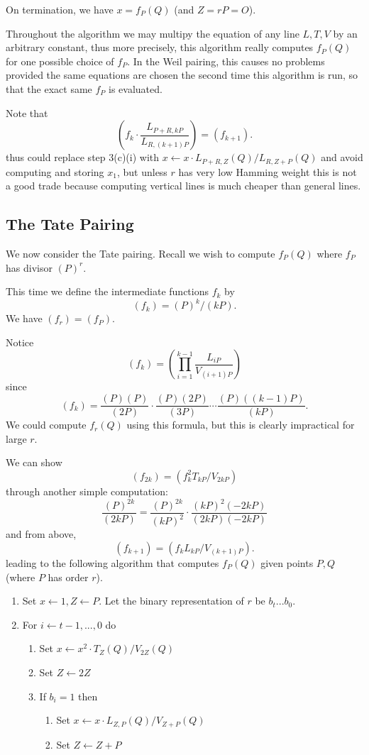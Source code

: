 On termination, we have $x = f_P(Q)$ (and $Z = rP = O$).

Throughout the algorithm we may multipy the equation of any line $L, T, V$
by an arbitrary constant, thus more precisely, this algorithm
really computes $f_P(Q)$ for one possible choice of $f_P$.
In the Weil pairing,
this causes no problems provided the same equations are chosen the second
time this algorithm is run, so that the exact same $f_P$ is evaluated.

Note that
\[
\left(
f_k \cdot \frac{L_{P+R,kP}}{L_{R,(k+1)P}}
\right) = (f_{k+1}) .
\]
thus could replace step 3(c)(i) with
$x \leftarrow x \cdot L_{P+R, Z}(Q) / L_{R,Z+P}(Q)$
and avoid computing and storing $x_1$, but unless
$r$ has very low Hamming weight this is not a good trade
because computing vertical lines is much cheaper than general lines.

\subsection {The Tate Pairing}

We now consider the Tate pairing. Recall we wish to compute
$f_P(Q)$ where $f_P$ has divisor $(P)^r$.

This time we define the intermediate functions $f_k$ by
\[ (f_k) = (P)^k / (kP) . \]
We have $(f_r) = (f_P)$.

Notice
\[ (f_k) = (\prod_{i=1}^{k-1} \frac{L_{iP}}{V_{(i+1)P}}) \]
since
\[ (f_k) =
\frac{(P)(P)}{(2P)}
\cdot
\frac{(P)(2P)}{(3P)}
\cdots
\frac{(P)((k-1)P)}{(kP)} .
\]
We could compute $f_r(Q)$ using this formula,
but this is clearly impractical for large $r$.

We can show
\[
(f_{2k}) = (f_k^2 T_{kP} / V_{2kP} )
\]
through another simple computation:
\[
\frac{(P)^{2k}}{(2kP)} =
\frac{(P)^{2k}}{(kP)^2} \cdot
\frac{(kP)^2 (-2kP)}{(2kP)(-2kP)}
\]
and from above,
\[
(f_{k+1}) = (f_k L_{kP} / V_{(k+1)P}).
\]
leading to the following algorithm that
computes $f_P(Q)$ given points $P,Q$ (where $P$ has order $r$).

\begin{enumerate}
\item
Set $x \leftarrow 1, Z \leftarrow P$.
Let the binary representation of $r$ be $b_t ... b_0$.
\item
For $i \leftarrow t-1, ..., 0$ do
    \begin{enumerate}
    \item
    Set $x \leftarrow x^2 \cdot T_Z(Q) / V_{2Z}(Q)$
    \item
    Set $Z \leftarrow 2Z$
    \item
    If $b_i = 1$ then
	\begin{enumerate}
	\item
	Set $x \leftarrow x \cdot L_{Z,P}(Q) / V_{Z+P}(Q)$
	\item
	Set $Z \leftarrow Z + P$
	\end{enumerate}
    \end{enumerate}
\end{enumerate}

